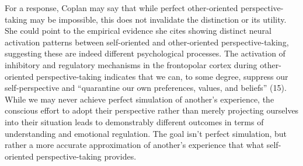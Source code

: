 \documentclass[11pt]{article}
\begin{document}
For a response, Coplan may say that while perfect other-oriented perspective-taking may be impossible, this does not invalidate the distinction or its utility. She could point to the empirical evidence she cites showing distinct neural activation patterns between self-oriented and other-oriented perspective-taking, suggesting these are indeed different psychological processes. The activation of inhibitory and regulatory mechanisms in the frontopolar cortex during other-oriented perspective-taking indicates that we can, to some degree, suppress our self-perspective and ``quarantine our own preferences, values, and beliefs'' (15). While we may never achieve perfect simulation of another's experience, the conscious effort to adopt their perspective rather than merely projecting ourselves into their situation leads to demonstrably different outcomes in terms of understanding and emotional regulation. The goal isn't perfect simulation, but rather a more accurate approximation of another's experience that what self-oriented perspective-taking provides. 
\end{document}
